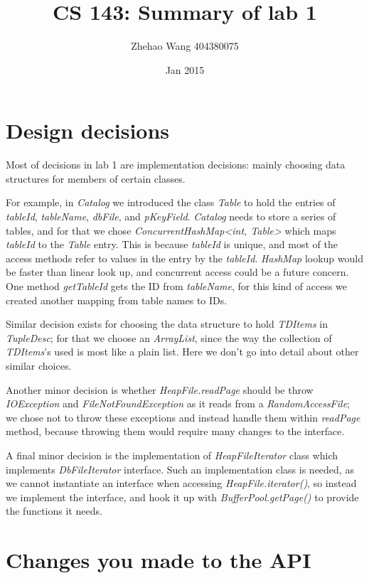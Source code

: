 \documentclass[11pt]{article}
\title{CS 143: Summary of lab 1}
\author{Zhehao Wang  404380075}
\date{Jan 2015}
\begin{document}
\maketitle

\section{Design decisions}

Most of decisions in lab 1 are implementation decisions: mainly choosing data structures for members of certain classes.

For example, in \textit{Catalog} we introduced the class \textit{Table} to hold the entries of \textit{tableId}, \textit{tableName}, \textit{dbFile}, and \textit{pKeyField}. \textit{Catalog} needs to store a series of tables, and for that we chose \textit{ConcurrentHashMap<int, Table>} which maps \textit{tableId} to the \textit{Table} entry. This is because \textit{tableId} is unique, and most of the access methods refer to values in the entry by the \textit{tableId}. \textit{HashMap} lookup would be faster than linear look up, and concurrent access could be a future concern. One method \textit{getTableId} gets the ID from \textit{tableName}, for this kind of access we created another mapping from table names to IDs.

Similar decision exists for choosing the data structure to hold \textit{TDItems} in \textit{TupleDesc}; for that we choose an \textit{ArrayList}, since the way the collection of \textit{TDItems}'s used is most like a plain list. Here we don't go into detail about other similar choices.

Another minor decision is whether \textit{HeapFile.readPage} should be throw \textit{IOException} and \textit{FileNotFoundException} as it reads from a \textit{RandomAccessFile}; we chose not to throw these exceptions and instead handle them within \textit{readPage} method, because throwing them would require many changes to the interface.

A final minor decision is the implementation of \textit{HeapFileIterator} class which implements \textit{DbFileIterator} interface. Such an implementation class is needed, as we cannot instantiate an interface when accessing \textit{HeapFile.iterator()}, so instead we implement the interface, and hook it up with \textit{BufferPool.getPage()} to provide the functions it needs.

\section{Changes you made to the API}
\end{document}
